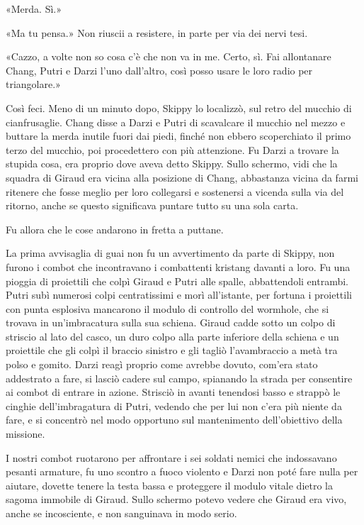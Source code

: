 «Merda. Sì.»

«Ma tu pensa.» Non riuscii a resistere, in parte per via dei nervi tesi.

«Cazzo, a volte non so cosa c'è che non va in me. Certo, sì. Fai
allontanare Chang, Putri e Darzi l'uno dall'altro, così posso usare le
loro radio per triangolare.»

Così feci. Meno di un minuto dopo, Skippy lo localizzò, sul retro del
mucchio di cianfrusaglie. Chang disse a Darzi e Putri di scavalcare il
mucchio nel mezzo e buttare la merda inutile fuori dai piedi, finché non
ebbero scoperchiato il primo terzo del mucchio, poi procedettero con più
attenzione. Fu Darzi a trovare la stupida cosa, era proprio dove aveva
detto Skippy. Sullo schermo, vidi che la squadra di Giraud era vicina
alla posizione di Chang, abbastanza vicina da farmi ritenere che fosse
meglio per loro collegarsi e sostenersi a vicenda sulla via del ritorno,
anche se questo significava puntare tutto su una sola carta.

Fu allora che le cose andarono in fretta a puttane.

La prima avvisaglia di guai non fu un avvertimento da parte di Skippy,
non furono i combot che incontravano i combattenti kristang davanti a
loro. Fu una pioggia di proiettili che colpì Giraud e Putri alle spalle,
abbattendoli entrambi. Putri subì numerosi colpi centratissimi e morì
all'istante, per fortuna i proiettili con punta esplosiva mancarono il
modulo di controllo del wormhole, che si trovava in un'imbracatura sulla
sua schiena. Giraud cadde sotto un colpo di striscio al lato del casco,
un duro colpo alla parte inferiore della schiena e un proiettile che gli
colpì il braccio sinistro e gli tagliò l'avambraccio a metà tra polso e
gomito. Darzi reagì proprio come avrebbe dovuto, com'era stato
addestrato a fare, si lasciò cadere sul campo, spianando la strada per
consentire ai combot di entrare in azione. Strisciò in avanti tenendosi
basso e strappò le cinghie dell'imbragatura di Putri, vedendo che per
lui non c'era più niente da fare, e si concentrò nel modo opportuno sul
mantenimento dell'obiettivo della missione.

I nostri combot ruotarono per affrontare i sei soldati nemici che
indossavano pesanti armature, fu uno scontro a fuoco violento e Darzi
non poté fare nulla per aiutare, dovette tenere la testa bassa e
proteggere il modulo vitale dietro la sagoma immobile di Giraud. Sullo
schermo potevo vedere che Giraud era vivo, anche se incosciente, e non
sanguinava in modo serio.

